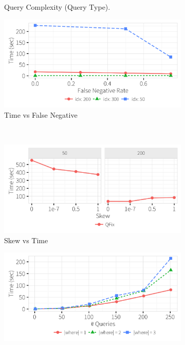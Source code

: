 \begin{figure}[h]
\begin{subfigure}[t]{.3\textwidth}
      \vspace*{-.2in}
      \caption{Query Complexity (Query Type).}
      \label{f:qidx_time} 
    \end{subfigure}
    \begin{subfigure}[t]{.3\textwidth}
    \includegraphics[width = .99\columnwidth]{figures/noise_fn_time}
    \vspace*{-.2in}
    \caption{Time vs False Negative}
    \label{f:falsenegative_time} 
    \end{subfigure} 
    \\
    \begin{subfigure}[t]{.3\textwidth}
    \includegraphics[width = .99\columnwidth]{figures/skew_time}
    \vspace*{-.2in}
    \caption{Skew vs Time}
    \label{f:skew_time} 
    \end{subfigure}
	\begin{subfigure}[t]{.3\textwidth}
      \includegraphics[width = .99\columnwidth]{figures/where_time}

\end{subfigure}
\end{figure}
